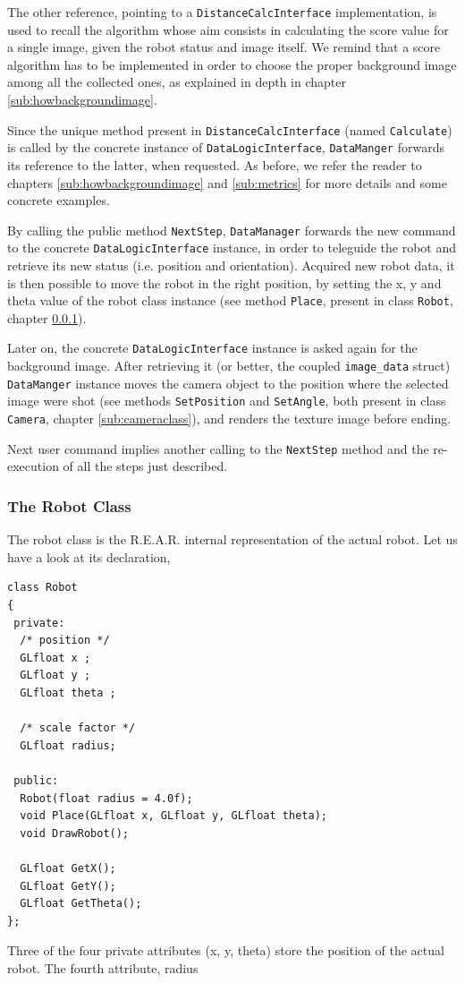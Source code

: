 %
The other reference, pointing to a \texttt{DistanceCalcInterface} implementation, is used to recall the algorithm
whose aim consists in calculating the score value for a single image, given the robot status and image itself. We
remind that a score algorithm has to be implemented in order to choose the proper background image among all the
collected ones, as explained in depth in chapter \ref{sub:howbackgroundimage}.
%

%
Since the unique method present in \texttt{DistanceCalcInterface} (named \texttt{Calculate}) is called by the
concrete instance of \texttt{DataLogicInterface}, \newline \texttt{DataManger} forwards its reference to the latter,
when requested. As before, we refer the reader to chapters \ref{sub:howbackgroundimage} and \ref{sub:metrics} for
more details and some concrete examples.
%

%
By calling the public method \texttt{NextStep}, \texttt{DataManager} forwards the new command to the concrete
\texttt{DataLogicInterface} instance, in order to teleguide the robot and retrieve its new status
(i.e. position and orientation). Acquired new robot data, it is then possible to move the robot in the
right position, by setting the x, y and theta value of the robot class instance (see method \texttt{Place},
present in class \texttt{Robot}, chapter \ref{sub:robotclass}).
%

%
Later on, the concrete \texttt{DataLogicInterface} instance is asked again for the background image. After
retrieving it (or better, the coupled \texttt{image\_data} struct) \texttt{DataManger} instance moves the camera
object to the position where the selected image were shot (see methods \texttt{SetPosition} and \texttt{SetAngle},
both present in class \texttt{Camera}, chapter \ref{sub:cameraclass}), and renders the texture image before ending.
%

%
Next user command implies another calling to the \texttt{NextStep} method and the re-execution of all the steps just
described.

\subsubsection{The Robot Class}
\label{sub:robotclass}

The robot class is the \textsf{R.E.A.R.} internal representation of 
the actual robot. Let us have a look at its declaration,

\begin{lstlisting}[caption={Robot class declaration}, label={code:robot_class}, frame=trBL]
class Robot
{
 private:
  /* position */
  GLfloat x ;
  GLfloat y ;					
  GLfloat theta ;  
  
  /* scale factor */
  GLfloat radius; 

 public:
  Robot(float radius = 4.0f);
  void Place(GLfloat x, GLfloat y, GLfloat theta);
  void DrawRobot();

  GLfloat GetX();
  GLfloat GetY();
  GLfloat GetTheta();    
};
\end{lstlisting}
%
Three of the four private attributes (\textsf{x, y, theta}) 
store the position of the actual robot. The fourth attribute, 
\textsf{radius}

